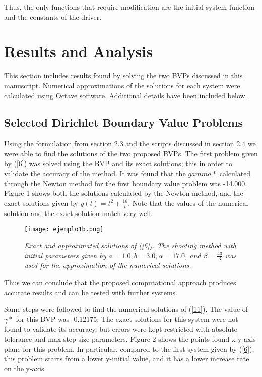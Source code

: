 \documentclass{article}
\begin{document}
Thus, the only functions that require modification are the initial system function and the constants of the driver.

\section{Results and Analysis}

This section includes results found by solving the two BVPs discussed in this manuscript. Numerical approximations of the solutions for each system were calculated using Octave software. Additional details have been included below.

\subsection{Selected Dirichlet Boundary Value Problems}

Using the formulation from section 2.3 and the scripts discussed in section 2.4 we were able to find the solutions of the two proposed BVPs. The first problem given by (\ref{6}) was solved using the BVP and its exact solutions; this in order to validate the accuracy of the method. It was found that the $gamma*$ calculated through the Newton method for the first boundary value problem was -14.000. Figure 1 shows both the solutions calculated by the Newton method, and the exact solutions given by $y(t)=t^2+\frac{16}{t}$. Note that the values of the numerical solution and the exact solution match very well. 

\begin{figure}[h!]
    \centering
    \texttt{[image: ejemplo1b.png]}
    \caption{\textit{Exact and approximated solutions of (\ref{6}). The shooting method with initial parameters given by $a = 1.0, b = 3.0, \alpha = 17.0$, and $\beta = \frac{43}{3}$ was used for the approximation of the numerical solutions.}}
\end{figure}

\newpage

Thus we can conclude that the proposed computational approach produces accurate results and can be tested with further systems.

Same steps were followed to find the numerical solutions of (\ref{11}). The value of $\gamma*$ for this BVP was -0.12175. The exact solutions for this system were not found to validate its accuracy, but errors were kept restricted with absolute tolerance and max step size parameters. Figure 2 shows the points found x-y axis plane for this problem. In particular, compared to the first system given by (\ref{6}), this problem starts from a lower y-initial value, and it has a lower increase rate on the y-axis.
\end{document}
